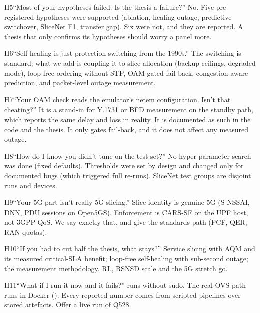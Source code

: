 \begin{qa}{H5}{``Most of your hypotheses failed. Is the thesis a failure?''}
No. Five pre-registered hypotheses were supported (ablation, healing outage, predictive switchover, SliceNet F1,
transfer gap). Six were not, and they are reported. A thesis that only confirms its hypotheses should worry a panel more.
\end{qa}

\begin{qa}{H6}{``Self-healing is just protection switching from the 1990s.''}
The switching is standard; what we add is coupling it to slice allocation (backup ceilings, degraded mode), loop-free
ordering without STP, OAM-gated fail-back, congestion-aware prediction, and packet-level outage measurement.
\end{qa}

\begin{qa}{H7}{``Your OAM check reads the emulator's netem configuration. Isn't that cheating?''}
It is a stand-in for Y.1731 or BFD measurement on the standby path, which reports the same delay and loss in reality.
It is documented as such in the code and the thesis. It only gates fail-back, and it does not affect any measured
outage.
\end{qa}

\begin{qa}{H8}{``How do I know you didn't tune on the test set?''}
No hyper-parameter search was done (fixed defaults). Thresholds were set by design and changed only for documented
bugs (which triggered full re-runs). SliceNet test groups are disjoint runs and devices.
\end{qa}

\begin{qa}{H9}{``Your 5G part isn't really 5G slicing.''}
Slice identity is genuine 5G (S-NSSAI, DNN, PDU sessions on Open5GS). Enforcement is CARS-SF on the UPF host, not
3GPP QoS. We say exactly that, and give the standards path (PCF, QER, RAN quotas).
\end{qa}

\begin{qa}{H10}{``If you had to cut half the thesis, what stays?''}
Service slicing with AQM and its measured critical-SLA benefit; loop-free self-healing with sub-second outage; the
measurement methodology. RL, RSNSD scale and the 5G stretch go.
\end{qa}

\begin{qa}{H11}{``What if I run it now and it fails?''}
 runs without sudo. The real-OVS path runs in Docker
(). Every reported number comes from scripted pipelines over stored artefacts.
Offer a live run of Q528.
\end{qa}

